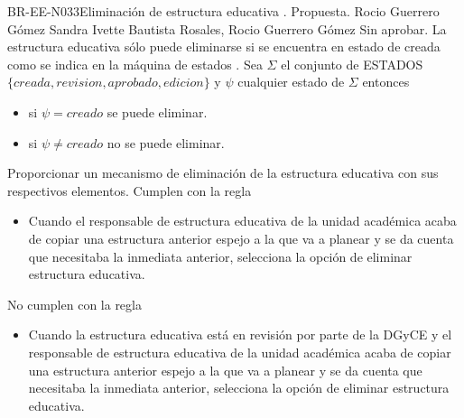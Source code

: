 \begin{BusinessRule}{BR-EE-N033}{Eliminación de estructura educativa}
	{\bcIntegridad}    %
	{\btEnabler}     %
	{\blControlling}    %
	.
	\BRItem[Estado] Propuesta.
	 Rocio Guerrero Gómez
	 Sandra Ivette Bautista Rosales, Rocio Guerrero Gómez
	 Sin aprobar.
	\BRItem[Descripción] La estructura educativa sólo puede eliminarse si se encuentra en estado de creada como se indica en la máquina de estados .
	\BRItem[Sentencia]  Sea $\Sigma$ el conjunto de ESTADOS $\{creada,revision,aprobado,edicion\}$  y $\psi$ cualquier estado de  $\Sigma$  entonces \\
	\begin{itemize}
		\item si $\psi = creado$ se puede eliminar.
		\item si $\psi \neq creado$  no se puede eliminar.	
	\end{itemize}

	\BRItem[Motivación] Proporcionar un mecanismo de eliminación de la estructura educativa con sus respectivos elementos.
	 Cumplen con la regla
	\begin{itemize}
		\item Cuando el responsable de estructura educativa de la unidad académica acaba de copiar una estructura anterior espejo a la que va a planear y se da cuenta que necesitaba la inmediata anterior, selecciona la opción de eliminar estructura educativa.
	\end{itemize}
	 No cumplen con la regla
	\begin{itemize}
		\item Cuando la estructura educativa está en revisión por parte de la DGyCE y el responsable de estructura educativa de la unidad académica acaba de copiar una estructura anterior espejo a la que va a planear y se da cuenta que necesitaba la inmediata anterior, selecciona la opción de eliminar estructura educativa.
	\end{itemize}
\end{BusinessRule}

